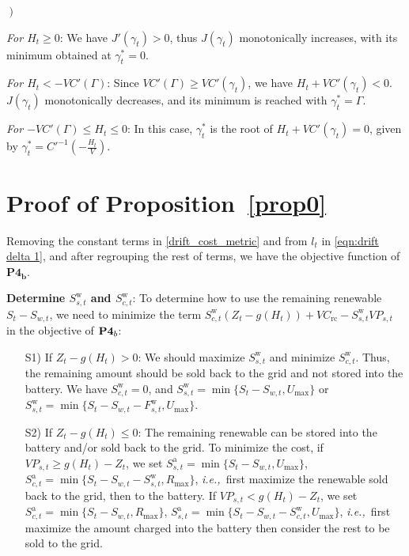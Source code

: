 \documentclass[journal]{IEEEtran}
\def\ie{{\it i.e.,\ \/}}
\def\w{\textrm{w}}
\begin{document}
\begin{list}{{\it {}$\left.\right)$~}}
{
\setlength\leftmargin{0em}
\setlength{}
\setlength{}
\setlength\itemsep{0em}
}
\item {\it For $H_t\geq0$}: We have $J'(\gamma_t)>0$, thus $J(\gamma_t)$ monotonically increases, with its minimum obtained at $\gamma_t^*=0$.
\item {\it For $H_t<-VC'(\Gamma)$}: Since $VC'(\Gamma)\ge VC'(\gamma_t)$, we have $H_t+VC'(\gamma_t)<0$.  $J(\gamma_t)$ monotonically decreases, and its minimum is reached with $\gamma^*_t=\Gamma$.
\item  {\it For $-VC'(\Gamma)\le H_t\le 0$}: In this case, $\gamma^*_t$ is the root of $H_t+VC'(\gamma_t)=0$, given by $\gamma^*_t=C'^{-1}\left(-\frac{H_t}{V}\right)$.
\endIEEEproof
\end{list}

\section{Proof of Proposition~\ref{prop0}}\label{app:p4b}
\IEEEproof
Removing the constant terms in \eqref{drift_cost_metric} and from $l_t$ in \eqref{eqn:drift delta 1},  and after regrouping the rest of terms, we have the objective function of $\textbf{P4}_{\textbf{b}}$.

{\bf Determine $S^\w_{s,t}$ and $S^\w_{c,t}$}: To determine how to use the remaining renewable $S_t-S_{w,t}$, we need to minimize the term $S^\w_{c,t}(Z_t-g(H_t))+VC_{\textrm{rc}}-S^\w_{s,t}VP_{s,t}$ in the objective of $\text{\bf P4}_b$:
\begin{itemize}
\item[S1)] If $Z_t- g(H_t)> 0$: We should maximize $S^\w_{s,t}$ and minimize $S^\w_{c,t}$. Thus, the remaining amount should be sold back to the grid and not stored into the battery. We have $S^\w_{c,t}=0$, and $S^\w_{s,t}=\min\{S_t-S_{w,t},U_{\max}\}$ or $S^\w_{s,t}=\min\{S_t-S_{w,t}-F^\w_{s,t},U_{\max}\}$.
\item[S2)] If $Z_t-g(H_t)\le0$: The remaining renewable can be    stored into the battery and/or sold back to the grid. To minimize the cost, if $VP_{s,t}\ge {g(H_t)-Z_t}$, we set $S^\text{a}_{s,t}=\min\{S_t-S_{w,t},U_{\max}\}$,  $S^\text{a}_{c,t}=\min\{S_t-S_{w,t}-S^\w_{s,t},R_{\max}\}$, \ie first maximize the renewable sold back to the grid, then to the battery.  If $VP_{s,t}< {g(H_t)-Z_t}$, we set $S^\text{a}_{c,t}=\min\{S_t-S_{w,t},R_{\max}\}$,  $S^\text{a}_{s,t}=\min\{S_t-S_{w,t}-S^\w_{c,t},U_{\max}\}$, \ie first maximize the amount charged into the battery then consider the rest to be sold to the grid.
\end{itemize}
\end{document}
